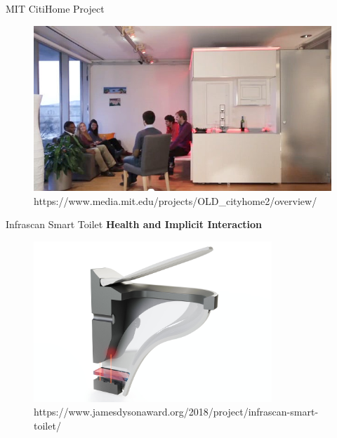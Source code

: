 \documentclass[10pt]{beamer}
\begin{document}
\begin{frame}{MIT CitiHome Project}
	\begin{figure}[H]
	\includegraphics[width=\textwidth]{images/5.jpg}
	\caption{https://www.media.mit.edu/projects/OLD\_cityhome2/overview/}
	\end{figure}
\end{frame}

\begin{frame}{Infrascan Smart Toilet}
	\textbf{Health and Implicit Interaction}\\
	\vspace{3mm}
	\begin{figure}[H]
	\includegraphics[width=0.8\textwidth]{images/7.png}
	\caption{https://www.jamesdysonaward.org/2018/project/infrascan-smart-toilet/}
	\end{figure}
\end{frame}
\end{document}
